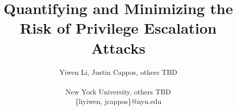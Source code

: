 \documentclass[letterpaper,twocolumn,10pt]{article}
\begin{document}




\title{Quantifying and Minimizing the Risk of Privilege Escalation Attacks}

\author{
{\rm Yiwen Li, Justin Cappos, others TBD}\\\\
New York University, others TBD \\
\{liyiwen, jcappos\}@nyu.edu
} %


\maketitle

















{
\footnotesize 


}



\end{document}
